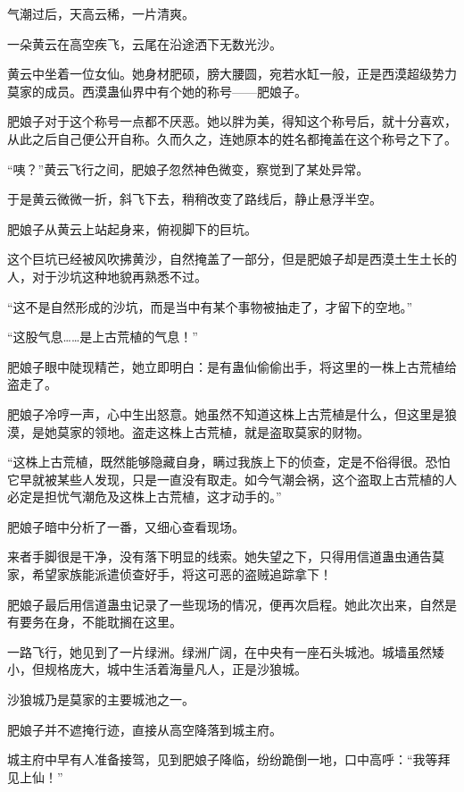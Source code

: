 
\begin{this_body}

气潮过后，天高云稀，一片清爽。

一朵黄云在高空疾飞，云尾在沿途洒下无数光沙。

黄云中坐着一位女仙。她身材肥硕，膀大腰圆，宛若水缸一般，正是西漠超级势力莫家的成员。西漠蛊仙界中有个她的称号——肥娘子。

肥娘子对于这个称号一点都不厌恶。她以胖为美，得知这个称号后，就十分喜欢，从此之后自己便公开自称。久而久之，连她原本的姓名都掩盖在这个称号之下了。

“咦？”黄云飞行之间，肥娘子忽然神色微变，察觉到了某处异常。

于是黄云微微一折，斜飞下去，稍稍改变了路线后，静止悬浮半空。

肥娘子从黄云上站起身来，俯视脚下的巨坑。

这个巨坑已经被风吹拂黄沙，自然掩盖了一部分，但是肥娘子却是西漠土生土长的人，对于沙坑这种地貌再熟悉不过。

“这不是自然形成的沙坑，而是当中有某个事物被抽走了，才留下的空地。”

“这股气息……是上古荒植的气息！”

肥娘子眼中陡现精芒，她立即明白：是有蛊仙偷偷出手，将这里的一株上古荒植给盗走了。

肥娘子冷哼一声，心中生出怒意。她虽然不知道这株上古荒植是什么，但这里是狼漠，是她莫家的领地。盗走这株上古荒植，就是盗取莫家的财物。

“这株上古荒植，既然能够隐藏自身，瞒过我族上下的侦查，定是不俗得很。恐怕它早就被某些人发现，只是一直没有取走。如今气潮会祸，这个盗取上古荒植的人必定是担忧气潮危及这株上古荒植，这才动手的。”

肥娘子暗中分析了一番，又细心查看现场。

来者手脚很是干净，没有落下明显的线索。她失望之下，只得用信道蛊虫通告莫家，希望家族能派遣侦查好手，将这可恶的盗贼追踪拿下！

肥娘子最后用信道蛊虫记录了一些现场的情况，便再次启程。她此次出来，自然是有要务在身，不能耽搁在这里。

一路飞行，她见到了一片绿洲。绿洲广阔，在中央有一座石头城池。城墙虽然矮小，但规格庞大，城中生活着海量凡人，正是沙狼城。

沙狼城乃是莫家的主要城池之一。

肥娘子并不遮掩行迹，直接从高空降落到城主府。

城主府中早有人准备接驾，见到肥娘子降临，纷纷跪倒一地，口中高呼：“我等拜见上仙！”


\end{this_body}

